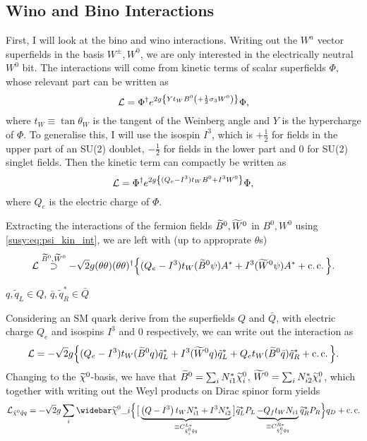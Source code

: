 \documentclass[../main.tex]{subfiles}
\begin{document}
\subsection{Wino and Bino Interactions}
First, I will look at the bino and wino interactions. Writing out the \(W^a\)
vector superfields in the basis \(W^\pm, W^0\), we are only interested in the
electrically neutral \(W^0\) bit. The interactions will come from kinetic terms
of scalar superfields \(\Phi\), whose relevant part can be written as
\begin{equation}
    \mathcal{L} = \Phi^\dagger e^{2g\left\{Y t_W B^0 \left(+ \frac{1}{2}\sigma_3 W^0\right)\right\}} \Phi,
\end{equation}
where \(t_W \equiv \tan\theta_W\) is the tangent of the Weinberg angle and \(Y\) is the hypercharge of \(\Phi\).
To generalise this, I will use the isospin \(I^3\), which is \(+\frac{1}{2}\) for fields in the upper part of an SU(2) doublet, \(-\frac{1}{2}\) for fields in the lower part and 0 for SU(2) singlet fields.
Then the kinetic term can compactly be written as
\begin{equation}
    \mathcal{L} = \Phi^\dagger e^{2g\left\{(Q_e - I^3) t_W B^0 + I^3 W^0\right\}} \Phi,
\end{equation}
where \(Q_e\) is the electric charge of \(\Phi\).
\medskip

Extracting the interactions of the fermion fields \(\widetilde{B}^0, \widetilde{W}^0\) in \(B^0,
W^0\) using \cref{susy:eq:psi_kin_int}, we are left with (up to approprate
\(\theta\)s)
\begin{equation}
    \mathcal{L} \stackrel{\widetilde{B}^0, \widetilde{W}^0}{\supset} -\sqrt{2}g (\theta\theta)(\theta\theta)^\dagger \Big\{ (Q_e - I^3)t_W (\widetilde{B}^0 \psi) A^\ast + I^3 (\widetilde{W}^0 \psi) A^\ast + \operatorname{c.c.} \Big\}.
\end{equation}

\begin{temporary}
    \(q, \tilde{q}_L \in Q\), \(\bar{q}, \tilde{q}_R^\ast \in \bar{Q}\)
\end{temporary}

Considering an SM quark derive from the superfields \(Q\) and \(\bar{Q}\), with
electric charge \(Q_e\) and isospins \(I^3\) and 0 respectively, we can write
out the interaction as
\begin{equation}
    \mathcal{L} = -\sqrt{2}g \Big\{ (Q_e - I^3)t_W (\widetilde{B}^0 q) \tilde{q}_L^\ast + I^3 (\widetilde{W}^0 q) \tilde{q}_L^\ast + Q_e t_W (\widetilde{B}^0 \bar{q}) \tilde{q}_R^\ast + \operatorname{c.c.} \Big\}.
\end{equation}
Changing to the \(\nino\)-basis, we have that \(\bino = \sum_i N_{i1}^\ast \nino[i]\), \(\wino = \sum_i N_{i2}^\ast \nino[i]\), which together with writing out the Weyl products on Dirac spinor form yields
\begin{equation}
    \label{susy:eq:nino_sf_f_int}
    \L_{\tilde{\chi}^0 \tilde{q}q} = -\sqrt{2} g \sum_{i} \barnino[i] \Big\{ \big[ \underbrace{\pclosed{Q - I^3}t_W N_{i1}^\ast  + I^3 N_{i2}^\ast}_{\equiv C_{\tilde{\chi}^0_i \tilde{q} q}^{L\ast}} \big] \wtilde{q}_L^\ast P_L \underbrace{- Q_f t_W N_{i1}}_{\equiv C_{\tilde{\chi}^0_i \tilde{q} q}^{R\ast}} \wtilde{q}_R^\ast P_R \Big\} q_D + \cc
\end{equation}
\end{document}
